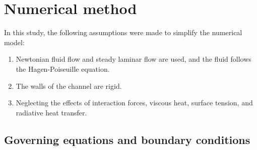 %
% 
%

\section{Numerical method}

In this study, the following assumptions were made to simplify the numerical model: 

\begin{enumerate}[1.] %
    \item Newtonian fluid flow and steady laminar flow are used, and the fluid follows the Hagen-Poiseuille equation.
    \item The walls of the channel are rigid.
    \item Neglecting the effects of interaction forces, viscous heat, surface tension, and radiative heat transfer.
\end{enumerate}

\subsection{Governing equations and boundary conditions}

